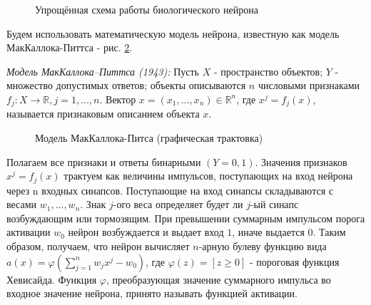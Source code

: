 \documentclass[../body.tex]{subfiles}
\begin{document}
\begin{figure}[H]
	\caption{Упрощённая схема работы биологического нейрона}
	\label{perceptronBioNeuron}
\end{figure}

Будем использовать математическую модель нейрона, известную как модель МакКаллока-Питтса - рис. \ref{perceptronNeuronModel}.

\textit{Модель МакКаллока–Питтса (1943):}  Пусть $X$ - пространство объектов; $Y$ - множество допустимых ответов; объекты описываются $n$ числовыми признаками $f_j: X \rightarrow \mathds{R}, j = 1,...,n$. Вектор $x = (x_1,... ,x_n)\in \mathds{R}^n$, где $x^j = f_j(x)$, называется признаковым описанием объекта $x$.

\begin{figure}[H]
	\caption{Модель МакКаллока-Питса (графическая трактовка)}
	\label{perceptronNeuronModel}
\end{figure}

Полагаем все признаки и ответы бинарными $(Y = {0, 1})$. Значения признаков $x^j = f_j(x)$ трактуем как величины импульсов, поступающих на вход нейрона через n входных синапсов. Поступающие на вход синапсы складываются с весами $w_1, ..., w_n$. Знак $j$-ого веса определяет будет ли $j$-ый синапс возбуждающим или тормозящим. При превышении суммарным импульсом порога активации $w_0$ нейрон возбуждается и выдает вход $1$, иначе выдается $0$. Таким образом, получаем, что нейрон вычисляет $n$-арную булеву функцию вида $a(x) = \varphi(\sum_{j=1}^{n} w_j x^j - w_0)$, где $\varphi(z) = [z \geq 0]$ - пороговая функция Хевисайда. Функция $\varphi$, преобразующая значение суммарного импульса во входное значение нейрона, принято называть функцией активации.
\end{document}
